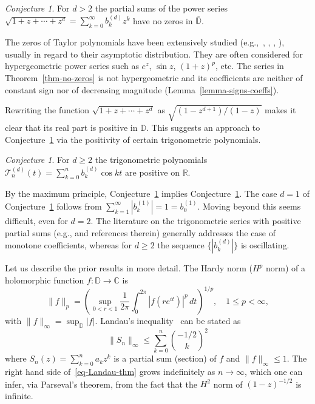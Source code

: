 \documentclass[12pt]{amsart}
\theoremstyle{definition}
\theoremstyle{remark}
\newtheorem{conjecture}[theorem]{Conjecture}
\numberwithin{equation}{section}
\begin{document}
\begin{conjecture}\label{q-zeros} For $d>2$  
the partial sums of the power series $\sqrt{1+z+\cdots+z^d} = \sum_{k=0}^\infty b_k^{(d)} z^k$ have no zeros in $\overline{\mathbb D}$. 
\end{conjecture}

The zeros of Taylor polynomials have been extensively studied (e.g.,~\cite{Dvoretzky}, \cite{EdreiSaffVarga}, \cite{JansonNorfolk}, \cite{Szego1936}), usually in regard to their asymptotic distribution. They are often considered for hypergeometric power series such as $e^z$, $\sin z$, $(1+z)^p$, etc. The series in Theorem~\ref{thm-no-zeros} is not hypergeometric and its coefficients are neither of constant sign nor of decreasing magnitude (Lemma~\ref{lemma-signs-coeffs}).  

Rewriting the function $\sqrt{1+z+\cdots+z^d}$ as $\sqrt{(1-z^{d+1})/(1-z)}$ makes it clear that its real part is positive in $\mathbb D$. This suggests an approach to Conjecture~\ref{q-zeros} via the positivity of certain trigonometric polynomials. 

\begin{conjecture}\label{q-positive} 
For $d\ge 2$ the trigonometric polynomials $\mathcal T_n^{(d)}(t)=\sum_{k=0}^n b_k^{(d)} \cos kt$ are positive on $\mathbb R$. 
\end{conjecture}

By the maximum principle, Conjecture~\ref{q-positive} implies Conjecture~\ref{q-zeros}. The case $d=1$ of Conjecture~\ref{q-positive} follows from $\sum_{k=1}^\infty |b_k^{(1)}| = 1 = b_0^{(1)}$. Moving beyond this seems difficult, even for $d=2$. The literature on the trigonometric series with positive partial sums (e.g., \cite{Belov, BrownWilson2} and references therein) generally addresses the case of monotone coefficients, whereas for $d\ge 2$ the sequence $\{|b_k^{(d)}|\}$ is oscillating. 

Let us describe the prior results in more detail. The Hardy norm ($H^p$ norm) of a holomorphic function $f\colon \mathbb D\to\mathbb C$ is 
\[
\|f\|_p = \left(\sup_{0<r<1} \frac{1}{2\pi} \int_0^{2\pi} |f(re^{it})|^p\,dt \right)^{1/p}, \quad 1\le p<\infty,
\]
with $\|f\|_\infty = \sup_{\mathbb D} |f|$. Landau's inequality~\cite{Landau} can be stated as
\begin{equation}\label{eq-Landau-thm} 
\|S_n\|_\infty \le \sum_{k=0}^n \binom{-1/2}{k}^2    
\end{equation}
where $S_n(z)=\sum_{k=0}^n a_k z^k$ is a partial sum (section) of $f$ and  $\|f\|_\infty\le 1$. The right hand side of~\eqref{eq-Landau-thm} grows indefinitely as $n\to\infty$, which one can infer, via Parseval's theorem, from the fact that the $H^2$ norm of $(1-z)^{-1/2}$ is infinite. 
\end{document}
